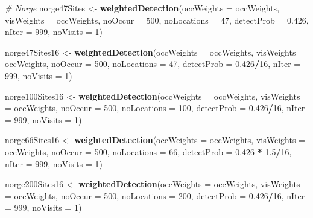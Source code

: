 \documentclass[]{article}
\newenvironment{Shaded}{\begin{snugshade}}{\end{snugshade}}
\newcommand{\KeywordTok}[1]{\textcolor[rgb]{0.13,0.29,0.53}{\textbf{#1}}}
\newcommand{\DataTypeTok}[1]{\textcolor[rgb]{0.13,0.29,0.53}{#1}}
\newcommand{\DecValTok}[1]{\textcolor[rgb]{0.00,0.00,0.81}{#1}}
\newcommand{\FloatTok}[1]{\textcolor[rgb]{0.00,0.00,0.81}{#1}}
\newcommand{\StringTok}[1]{\textcolor[rgb]{0.31,0.60,0.02}{#1}}
\newcommand{\CommentTok}[1]{\textcolor[rgb]{0.56,0.35,0.01}{\textit{#1}}}
\newcommand{\OperatorTok}[1]{\textcolor[rgb]{0.81,0.36,0.00}{\textbf{#1}}}
\newcommand{\NormalTok}[1]{#1}
\begin{document}
\begin{Shaded}
\begin{Highlighting}[]
\CommentTok{# Norge}
\NormalTok{norge47Sites <-}\StringTok{ }\KeywordTok{weightedDetection}\NormalTok{(}\DataTypeTok{occWeights =}\NormalTok{ occWeights, }\DataTypeTok{visWeights =}\NormalTok{ occWeights, }
    \DataTypeTok{noOccur =} \DecValTok{500}\NormalTok{, }\DataTypeTok{noLocations =} \DecValTok{47}\NormalTok{, }\DataTypeTok{detectProb =} \FloatTok{0.426}\NormalTok{, }\DataTypeTok{nIter =} \DecValTok{999}\NormalTok{, }\DataTypeTok{noVisits =} \DecValTok{1}\NormalTok{)}

\NormalTok{norge47Sites16 <-}\StringTok{ }\KeywordTok{weightedDetection}\NormalTok{(}\DataTypeTok{occWeights =}\NormalTok{ occWeights, }\DataTypeTok{visWeights =}\NormalTok{ occWeights, }
    \DataTypeTok{noOccur =} \DecValTok{500}\NormalTok{, }\DataTypeTok{noLocations =} \DecValTok{47}\NormalTok{, }\DataTypeTok{detectProb =} \FloatTok{0.426}\OperatorTok{/}\DecValTok{16}\NormalTok{, }\DataTypeTok{nIter =} \DecValTok{999}\NormalTok{, }\DataTypeTok{noVisits =} \DecValTok{1}\NormalTok{)}

\NormalTok{norge100Sites16 <-}\StringTok{ }\KeywordTok{weightedDetection}\NormalTok{(}\DataTypeTok{occWeights =}\NormalTok{ occWeights, }\DataTypeTok{visWeights =}\NormalTok{ occWeights, }
    \DataTypeTok{noOccur =} \DecValTok{500}\NormalTok{, }\DataTypeTok{noLocations =} \DecValTok{100}\NormalTok{, }\DataTypeTok{detectProb =} \FloatTok{0.426}\OperatorTok{/}\DecValTok{16}\NormalTok{, }\DataTypeTok{nIter =} \DecValTok{999}\NormalTok{, }\DataTypeTok{noVisits =} \DecValTok{1}\NormalTok{)}


\NormalTok{norge66Sites16 <-}\StringTok{ }\KeywordTok{weightedDetection}\NormalTok{(}\DataTypeTok{occWeights =}\NormalTok{ occWeights, }\DataTypeTok{visWeights =}\NormalTok{ occWeights, }
    \DataTypeTok{noOccur =} \DecValTok{500}\NormalTok{, }\DataTypeTok{noLocations =} \DecValTok{66}\NormalTok{, }\DataTypeTok{detectProb =} \FloatTok{0.426} \OperatorTok{*}\StringTok{ }\FloatTok{1.5}\OperatorTok{/}\DecValTok{16}\NormalTok{, }\DataTypeTok{nIter =} \DecValTok{999}\NormalTok{, }
    \DataTypeTok{noVisits =} \DecValTok{1}\NormalTok{)}

\NormalTok{norge200Sites16 <-}\StringTok{ }\KeywordTok{weightedDetection}\NormalTok{(}\DataTypeTok{occWeights =}\NormalTok{ occWeights, }\DataTypeTok{visWeights =}\NormalTok{ occWeights, }
    \DataTypeTok{noOccur =} \DecValTok{500}\NormalTok{, }\DataTypeTok{noLocations =} \DecValTok{200}\NormalTok{, }\DataTypeTok{detectProb =} \FloatTok{0.426}\OperatorTok{/}\DecValTok{16}\NormalTok{, }\DataTypeTok{nIter =} \DecValTok{999}\NormalTok{, }\DataTypeTok{noVisits =} \DecValTok{1}\NormalTok{)}




\end{Highlighting}
\end{Shaded}
\end{document}

